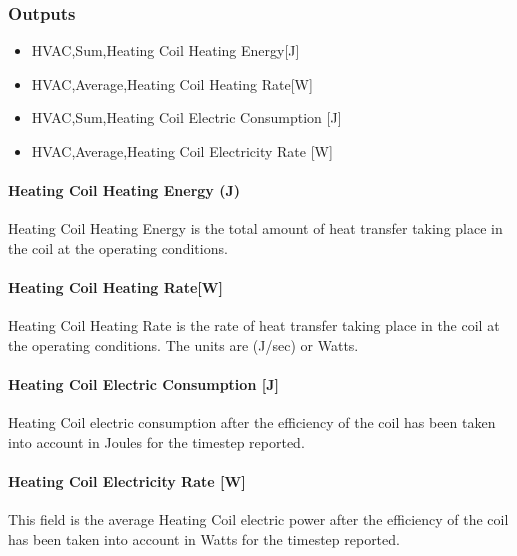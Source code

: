 \subsubsection{Outputs}\label{outputs-3-009}

\begin{itemize}
\item
  HVAC,Sum,Heating Coil Heating Energy{[}J{]}
\item
  HVAC,Average,Heating Coil Heating Rate{[}W{]}
\item
  HVAC,Sum,Heating Coil Electric Consumption {[}J{]}
\item
  HVAC,Average,Heating Coil Electricity Rate {[}W{]}
\end{itemize}

\paragraph{Heating Coil Heating Energy (J)}\label{heating-coil-energy-j}

Heating Coil Heating Energy is the total amount of heat transfer taking place in the coil at the operating conditions.

\paragraph{Heating Coil Heating Rate{[}W{]}}\label{heating-coil-ratew}

Heating Coil Heating Rate is the rate of heat transfer taking place in the coil at the operating conditions. The units are (J/sec) or Watts.

\paragraph{Heating Coil Electric Consumption {[}J{]}}\label{heating-coil-electric-consumption-j}

Heating Coil electric consumption after the efficiency of the coil has been taken into account in Joules for the timestep reported.

\paragraph{Heating Coil Electricity Rate {[}W{]}}\label{heating-coil-electric-power-w-1}

This field is the average Heating Coil electric power after the efficiency of the coil has been taken into account in Watts for the timestep reported.

